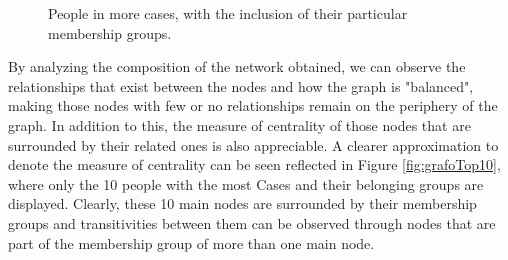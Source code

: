 \vspace{-10pt}
\begin{figure}[htbp]
	\centering
	\centering
	\caption{ People in more cases, with the inclusion of their particular membership groups.}
	\label{fig:grafosCompletos}
\end{figure}
\vspace{-10pt}
By analyzing the composition of the network obtained, we can observe the relationships that exist between the nodes and how the graph is "balanced", making those nodes with few or no relationships remain on the periphery of the graph. In addition to this, the measure of centrality of those nodes that are surrounded by their related ones is also appreciable. A clearer approximation to denote the measure of centrality can be seen reflected in Figure \ref{fig:grafoTop10}, where only the 10 people with the most Cases and their belonging groups are displayed. Clearly, these 10 main nodes are surrounded by their membership groups and transitivities between them can be observed through nodes that are part of the membership group of more than one main node.
